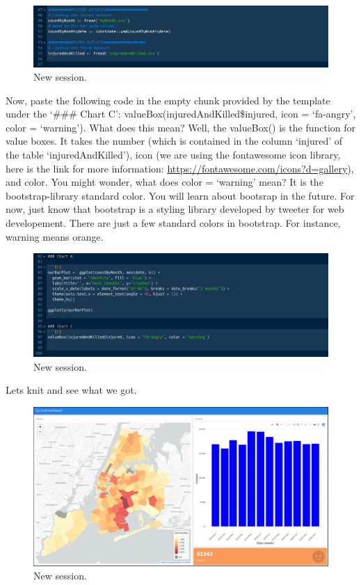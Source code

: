 \documentclass[]{book}
\begin{document}
\begin{figure}
\centering
\includegraphics{flex3rd.png}
\caption{New session.}
\end{figure}

Now, paste the following code in the empty chunk provided by the template under the `\#\#\# Chart C': valueBox(injuredAndKilled\$injured, icon = `fa-angry', color = `warning'). What does this mean? Well, the valueBox() is the function for value boxes. It takes the number (which is contained in the column `injured' of the table `injuredAndKilled'), icon (we are using the fontawesome icon library, here is the link for more information: \url{https://fontawesome.com/icons?d=gallery}), and color. You might wonder, what does color = `warning' mean? It is the bootstrap-library standard color. You will learn about bootsrap in the future. For now, just know that bootstrap is a styling library developed by tweeter for web developement. There are just a few standard colors in bootstrap. For instance, warning means orange.

\begin{figure}
\centering
\includegraphics{flex11.png}
\caption{New session.}
\end{figure}

Lets knit and see what we got.

\begin{figure}
\centering
\includegraphics{flex12.png}
\caption{New session.}
\end{figure}
\end{document}
